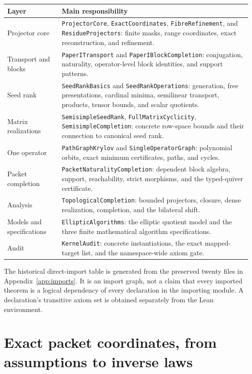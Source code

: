\documentclass[11pt,a4paper]{article}
\newcommand{\code}[1]{\nolinkurl{#1}}
\begin{document}
\begin{longtable}{p{}p{}}
\toprule Layer & Main responsibility \\\midrule\endhead
Projector core & \code{ProjectorCore}, \code{ExactCoordinates}, \code{FibreRefinement}, and \code{ResidueProjectors}: finite masks, range coordinates, exact reconstruction, and refinement. \\
Transport and blocks & \code{PaperITransport} and \code{PaperIBlockCompletion}: conjugation, naturality, operator-level block identities, and support patterns. \\
Seed rank & \code{SeedRankBasics} and \code{SeedRankOperations}: generation, free presentations, cardinal minima, semilinear transport, products, tensor bounds, and scalar quotients. \\
Matrix realizations & \code{SemisimpleSeedRank}, \code{FullMatrixCyclicity}, \code{SemisimpleCompletion}: concrete row-space bounds and their connection to canonical seed rank. \\
One operator & \code{PathGraphKrylov} and \code{SingleOperatorGraph}: polynomial orbits, exact minimum certificates, paths, and cycles. \\
Packet completion & \code{PacketNaturalityCompletion}: dependent block algebra, support, reachability, strict morphisms, and the typed-quiver certificate. \\
Analysis & \code{TopologicalCompletion}: bounded projectors, closure, dense realization, completion, and the bilateral shift. \\
Models and specifications & \code{EllipticAlgorithms}: the elliptic quotient model and the three finite mathematical algorithm specifications. \\
Audit & \code{KernelAudit}: concrete instantiations, the exact mapped-target list, and the namespace-wide axiom gate. \\
\bottomrule
\end{longtable}

The historical direct-import table is generated from the preserved twenty files in Appendix~\ref{app:imports}. It is an import graph, not a claim that every imported theorem is a logical dependency of every declaration in the importing module. A declaration's transitive axiom set is obtained separately from the Lean environment.

\section{Exact packet coordinates, from assumptions to inverse laws}\label{sec:packets}
\end{document}
